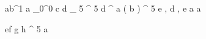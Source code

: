 \begin{eqcode}{a}{b}{^1}{}
  a \gets {}_0^0 \lend
  c \gets d _ 5 ^ 5 \lend
  d \gets \genar \limits ^ { a } ( b ) ^ 5 \lend
  e , d , e  \lend
  a \gets {} \lend
  a \gets {} \lend
\end{eqcode}


\begin{eqcode}{e}{f}{}{}
  g \gets h ^ 5 \lend
  a  \lend
\end{eqcode}

